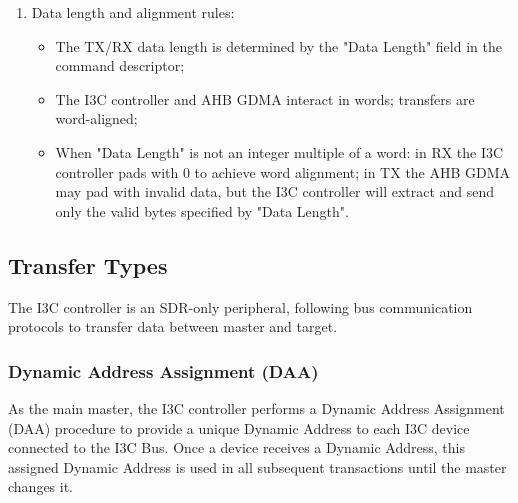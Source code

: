 \documentclass[main\_\_EN.tex]{subfiles}
\begin{document}
\begin{enumerate}
\begin{itemize}
        \item Configure the transmit (TX) channel:
        \begin{itemize}
            \item Before TX begins, prepare the transmit linked list and the data to be sent;
            \item Point \texttt{GDMA\_OUTLINK\_ADDR\_CHn} to the first transmit linked-list descriptor and set \texttt{GDMA\_OUTLINK\_START\_CHn};
            \item After start, the GDMA engine reads data from the transmit linked list and provides it to the I3C controller, which transmits the data over the SDA line.
        \end{itemize}
    \end{itemize}

    \item Data length and alignment rules:
    \begin{itemize}
        \item The TX/RX data length is determined by the "Data Length" field in the command descriptor;
        \item The I3C controller and AHB GDMA interact in words; transfers are word-aligned;
        \item When "Data Length" is not an integer multiple of a word: in RX the I3C controller pads with 0 to achieve word alignment; in TX the AHB GDMA may pad with invalid data, but the I3C controller will extract and send only the valid bytes specified by "Data Length".
    \end{itemize}
\end{enumerate}

\subsection{Transfer Types}

The I3C controller is an SDR-only peripheral, following bus communication protocols to transfer data between master and target.

\subsubsection{Dynamic Address Assignment (DAA)}

As the main master, the I3C controller performs a Dynamic Address Assignment (DAA) procedure to provide a unique Dynamic Address to each I3C device connected to the I3C Bus. Once a device receives a Dynamic Address, this assigned Dynamic Address is used in all subsequent transactions until the master changes it.
\end{document}
